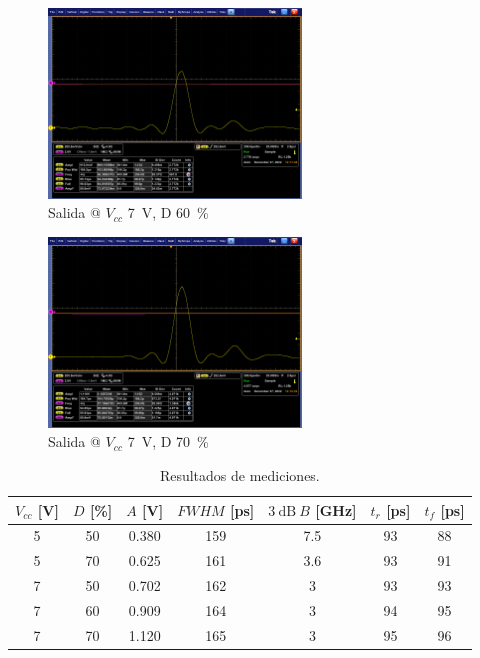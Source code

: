 \begin{figure}
  \centering
    \includegraphics[width=0.6\textwidth]{images/mediciones/vcc_7v_duty_60.png}
    \caption{Salida @ $V_{cc}$ \qty{7}{\volt}, D \qty{60}{\percent} }
    \label{fig:mediciones_7v_60}
\end{figure}

\begin{figure}
  \centering
    \includegraphics[width=0.6\textwidth]{images/mediciones/vcc_7v_duty_70.png}
    \caption{Salida @ $V_{cc}$ \qty{7}{\volt}, D \qty{70}{\percent} }
    \label{fig:mediciones_7v_70}
\end{figure}

\begin{table}
\centering
\begin{tabular}{ccccccc}
\hline
$V_{cc}$ [\unit{\volt}] & $D$ [\unit{\percent}] & $A$ [\unit{\volt}] &
    $FWHM$ [\unit{\pico\second}] & $\qty{3}{\dB} \ B$ [\unit{\giga\hertz}]& $t_r$
    [\unit{\pico\second}]& $t_f$ [\unit{\pico\second}]\\
\hline
5 & 50 & 0.380 & 159 & 7.5 & 93 & 88 \\
5 & 70 & 0.625 & 161 & 3.6 & 93 & 91 \\
7 & 50 & 0.702 & 162 & 3 & 93 & 93 \\
7 & 60 & 0.909 & 164 & 3 & 94 & 95 \\
7 & 70 & 1.120 & 165 & 3 & 95 & 96 \\
\hline
\end{tabular}
\caption{Resultados de mediciones.}
\label{tab:mediciones_resultados}
\end{table}

